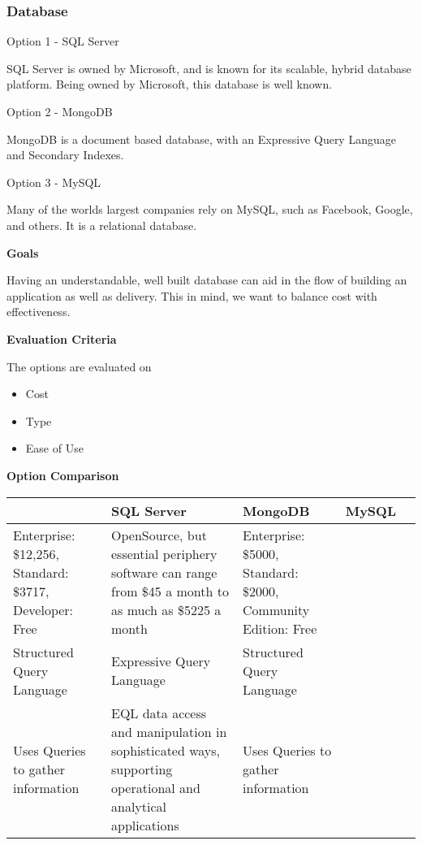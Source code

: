 \documentclass[letterpaper, 10pt, draftclsnofoot, compsoc, onecolumn]{IEEEtran}
\begin{document}
{\medskip

\newpage
\subsubsection{Database}
{\noindent Option 1 - SQL Server \par}
{\noindent SQL Server is owned by Microsoft, and is known for its scalable, hybrid database platform. Being owned by Microsoft, this database is well known. \cite{SQL Server} \par}

\medskip
{\noindent Option 2 - MongoDB \par}
{\noindent MongoDB is a document based database, with an Expressive Query Language and Secondary Indexes. \cite{MongoDB}  \par}

\medskip
{\noindent Option 3 - MySQL \par}
{\noindent Many of the worlds largest companies rely on MySQL, such as Facebook, Google, and others. It is a relational database. \cite{MySQL}  \par}

\medskip
{\noindent\rmfamily\bfseries\color{black} Goals \par}
{\noindent Having an understandable, well built database can aid in the flow of building an application as well as delivery. This in mind, we want to balance cost with effectiveness. \cite{MySQL} \par}

\medskip
\newpage
{\noindent\rmfamily\bfseries\color{black} Evaluation Criteria \par}
{\noindent The options are evaluated on 

\begin{itemize}
\item Cost
\item Type
\item Ease of Use
\end{itemize}

 \par}


\newpage
{\noindent\rmfamily\bfseries\color{black} Option Comparison \par}
\tablehead{}
\begin{supertabular}{|p{2cm}|p{2.5cm}|p{2.5cm}|p{2.5cm}|p{2.5cm}|}
\hline & SQL Server & MongoDB & MySQL\\ \hline
Enterprise: \$12,256, Standard: \$3717, Developer: Free & OpenSource, but essential periphery software can range from \$45 a month to as much as \$5225 a month & Enterprise: \$5000, Standard: \$2000, Community Edition: Free \\ \hline
\hline Structured Query Language & Expressive Query Language & Structured Query Language\\ \hline
\hline Uses Queries to gather information & EQL data access and manipulation in sophisticated ways, supporting operational and analytical applications \cite{ibmbpnetwork} & Uses Queries to gather information \\ \hline
\end{supertabular}

}
\end{document}
